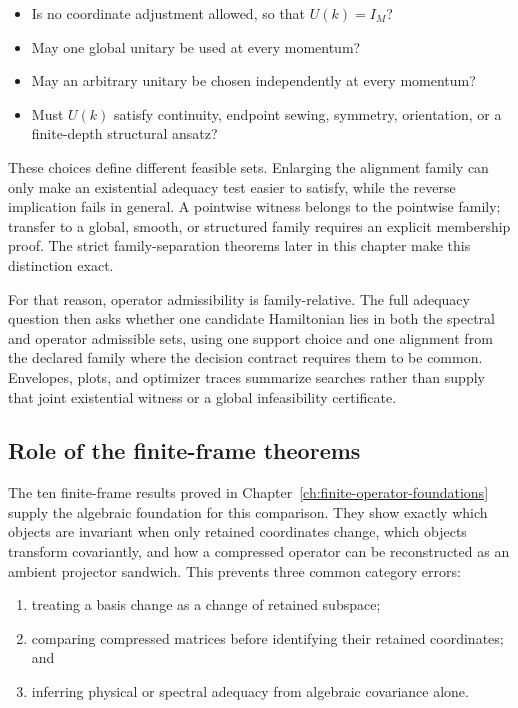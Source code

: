 \begin{itemize}
  \item Is no coordinate adjustment allowed, so that $U(k)=I_M$?
  \item May one global unitary be used at every momentum?
  \item May an arbitrary unitary be chosen independently at every momentum?
  \item Must $U(k)$ satisfy continuity, endpoint sewing, symmetry, orientation, or a
        finite-depth structural ansatz?
\end{itemize}

These choices define different feasible sets. Enlarging the alignment family can only
make an existential adequacy test easier to satisfy, while the reverse implication
fails in general. A pointwise witness belongs to the pointwise family; transfer to a
global, smooth, or structured family requires an explicit membership proof. The strict
family-separation theorems later in this chapter make this distinction exact.

For that reason, operator admissibility is family-relative. The full adequacy question
then asks whether one candidate Hamiltonian lies in both the spectral and operator
admissible sets, using one support choice and one alignment from the declared family
where the decision contract requires them to be common. Envelopes, plots, and optimizer
traces summarize searches rather than supply that joint existential witness or a global
infeasibility certificate.

\subsection{Role of the finite-frame theorems}

The ten finite-frame results proved in
Chapter~\ref{ch:finite-operator-foundations} supply the algebraic foundation for this
comparison. They show exactly which objects are invariant when only retained coordinates
change, which objects transform covariantly, and how a compressed operator can be
reconstructed as an ambient projector sandwich. This prevents three common category
errors:

\begin{enumerate}
  \item treating a basis change as a change of retained subspace;
  \item comparing compressed matrices before identifying their retained coordinates;
        and
  \item inferring physical or spectral adequacy from algebraic covariance alone.
\end{enumerate}

